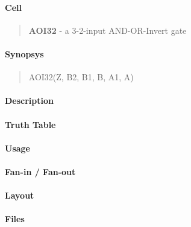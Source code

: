 \label{AOI32}
\paragraph{Cell}
\begin{quote}
    \textbf{AOI32} - a 3-2-input AND-OR-Invert gate
\end{quote}

\paragraph{Synopsys}
\begin{quote}
    AOI32(Z, B2, B1, B, A1, A)
\end{quote}

\paragraph{Description}



\paragraph{Truth Table}


\paragraph{Usage}

\paragraph{Fan-in / Fan-out}

\paragraph{Layout}

\paragraph{Files}
